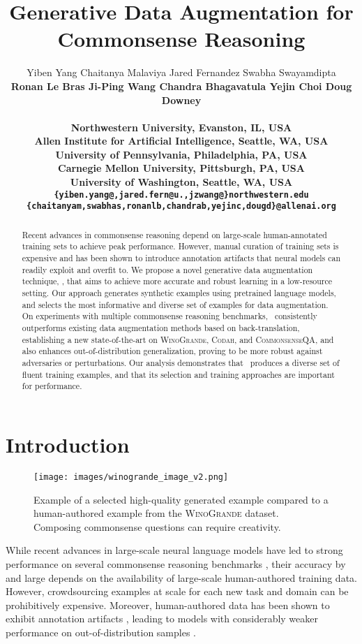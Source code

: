 \documentclass[11pt,a4paper]{article}
\title{
Generative Data Augmentation for Commonsense Reasoning}
\author{
    Yiben Yang  
	Chaitanya Malaviya 
    Jared Fernandez   
	Swabha Swayamdipta  \\
	\bf Ronan Le Bras 
	Ji-Ping Wang 
	Chandra Bhagavatula
	Yejin Choi	
	Doug Downey   \\\\
    Northwestern University, Evanston, IL, USA \\
	Allen Institute for Artificial Intelligence, Seattle, WA, USA \\
	 University of Pennsylvania, Philadelphia, PA, USA \\
	 Carnegie Mellon University, Pittsburgh, PA, USA \\
	University of Washington, Seattle, WA, USA \\
	{\tt \{yiben.yang@,jared.fern@u.,jzwang@\}northwestern.edu} \\
	{\tt \{chaitanyam,swabhas,ronanlb,chandrab,yejinc,dougd\}@allenai.org}  
}
\date{}
\newcommand{\reasoning}{commonsense reasoning\xspace}
\newcommand{\gdaug}{}
\newcommand{\winogrande}{\textsc{WinoGrande}\xspace}
\newcommand{\codah}{\textsc{Codah}\xspace}
\newcommand{\comqa}{\textsc{CommonsenseQA}\xspace}
\begin{document}
\maketitle
\begin{abstract}


Recent advances in \reasoning depend on large-scale human-annotated training sets to achieve peak performance. 
However, manual curation of training sets is expensive and has been shown to introduce annotation artifacts that neural models can readily exploit and overfit to. 
We propose a novel generative data augmentation technique, \textbf{\gdaug}, that aims to achieve more accurate and robust learning in a low-resource setting. 
Our approach generates synthetic examples using pretrained language models, and selects the most informative and diverse set of examples for data augmentation. 
On experiments with multiple commonsense reasoning benchmarks, \gdaug\ consistently outperforms existing data augmentation methods based on back-translation, establishing a new state-of-the-art on \winogrande, \codah, and \comqa, and also enhances out-of-distribution generalization, proving to be more robust against adversaries or perturbations.
Our analysis demonstrates that \gdaug\ produces a diverse set of fluent training examples, and that its selection and training approaches are important for performance. 
\end{abstract} 
\section{Introduction}
\label{sec:intro}

\begin{figure}[t!]
\centering
  \texttt{[image: images/winogrande\_image\_v2.png]}
  \caption{Example of a selected high-quality generated example compared to a human-authored example from the \winogrande dataset. Composing commonsense questions can require creativity.}
  \label{fig:winogrande_gen}
\end{figure}


While recent advances in large-scale neural language models \cite{devlin-etal-2019-bert, liu2019roberta, radford2019language, 2019t5} have led to strong performance on several commonsense reasoning benchmarks \cite{talmor-etal-2019-commonsenseqa, hekcqa_aaai20, sakaguchi2019winogrande}, their accuracy by and large depends on the availability of large-scale human-authored training data. 
However, crowdsourcing examples at scale for each new task and domain can be prohibitively expensive.  
Moreover, 
human-authored data has been shown to exhibit annotation artifacts \cite{gururangan-etal-2018-annotation,Agrawal2018DontJA,schwartz-etal-2017-effect}, 
leading to models with considerably weaker performance on out-of-distribution samples \cite{jia-liang-2017-adversarial,belinkov2017synthetic,iyyer-etal-2018-adversarial}.
 
\end{document}
